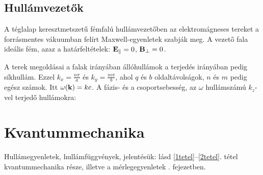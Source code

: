   \subsection{Hullámvezetők}
   
   A téglalap keresztmetszetű fémfalú hullámvezetőben az elektromágneses tereket a forrásmentes vákuumban felírt Maxwell-egyenletek szabják meg. A vezető fala ideális fém, azaz a határfeltételek: $\mathbf{E}_\parallel=0$, $\mathbf{B}_\perp=0$.
   
   A terek megoldásai a falak irányában állóhullámok a terjedés irányában pedig síkhullám. Ezzel $k_x=\frac{n\pi}{a}$ és  $k_y=\frac{m\pi}{b}$, ahol $q$ és $b$ oldaltávolságok, $n$ és $m$ pedig egész számok. Itt $\omega(\mathbf{k})=kc$. A fázis- és a csoportsebesség, az $\omega$ hullámszámú $k_z$-vel terjedő hullámokra:
   
 \section{Kvantummechanika}
  
  Hullámegyenletek, hullámfüggvények, jelentésük: lásd \ref{1tetel}--\ref{2tetel}. tétel kvantummechanika része, illetve a mérlegegyenletek . fejezetben.
  
